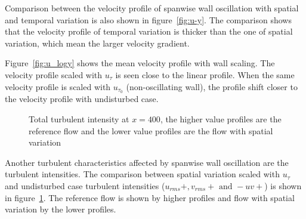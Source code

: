  Comparison between the velocity profile of spanwise wall oscillation with spatial and temporal variation is also shown in figure~\ref{fig:u-y}. The comparison shows that the velocity profile of temporal variation is thicker than the one of spatial variation, which mean the larger velocity gradient.

Figure~\ref{fig:u_logy} shows the mean velocity profile with wall scaling. The velocity profile scaled with $u_{\tau}$ is seen close to the linear profile. When the same velocity profile is scaled with $u_{\tau_0}$ (non-oscillating wall), the profile shift closer to the velocity profile with undisturbed case.

\begin{figure}[!h]
  \centering
  \caption{Total turbulent intensity at $x=400$, the higher value profiles are the reference flow and the lower value profiles are the flow with spatial variation}
  \label{fig:stats_total}
\end{figure}

Another turbulent characteristics affected by spanwise wall oscillation are the turbulent intensities. The comparison between spatial variation scaled with $u_{\tau}$ and undisturbed case turbulent intensities ($u_{rms}+, v_{rms}+ \mbox{ and } -uv+$) is shown in figure~\ref{fig:stats_total}. The reference flow is shown by higher profiles and flow with spatial variation by the lower profiles.

